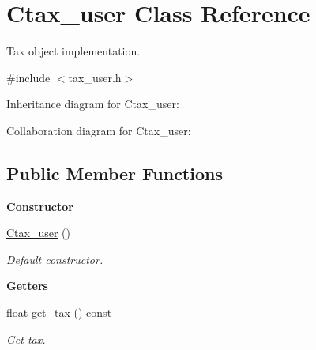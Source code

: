 \hypertarget{class_ctax__user}{\section{Ctax\+\_\+user Class Reference}
\label{class_ctax__user}
}


Tax object implementation.  




{\ttfamily \#include $<$tax\+\_\+user.\+h$>$}



Inheritance diagram for Ctax\+\_\+user\+:


Collaboration diagram for Ctax\+\_\+user\+:
\subsection*{Public Member Functions}
\begin{Indent}{\bf Constructor}\par
\begin{DoxyCompactItemize}
\item 
\hyperlink{class_ctax__user_ae6899d23d2994b08747ab5797bd4c8ac}{Ctax\+\_\+user} ()
\begin{DoxyCompactList}\small\item\em Default constructor. \end{DoxyCompactList}\end{DoxyCompactItemize}
\end{Indent}
\begin{Indent}{\bf Getters}\par
\begin{DoxyCompactItemize}
\item 
float \hyperlink{class_ctax__user_ab1f12b4fe4fb3d5dac5d6fbdcbbed469}{get\+\_\+tax} () const 
\begin{DoxyCompactList}\small\item\em Get tax. \end{DoxyCompactList}\end{DoxyCompactItemize}
\end{Indent}

